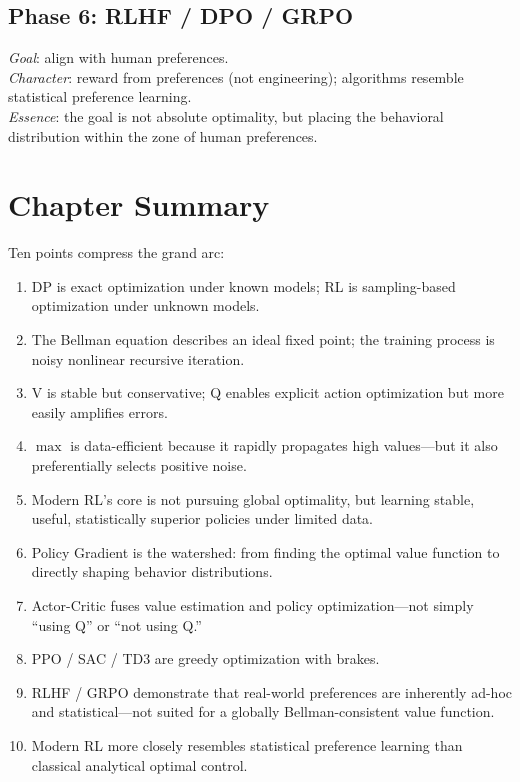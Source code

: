 \subsection*{Phase 6: RLHF / DPO / GRPO}
\emph{Goal}: align with human preferences.\\
\emph{Character}: reward from preferences (not engineering); algorithms resemble statistical preference learning.\\
\emph{Essence}: the goal is not absolute optimality, but placing the behavioral distribution within the zone of human preferences.

\section{Chapter Summary}
\label{sec:ch2-summary}

Ten points compress the grand arc:

\begin{enumerate}
    \item DP is exact optimization under known models; RL is sampling-based optimization under unknown models.
    \item The Bellman equation describes an ideal fixed point; the training process is noisy nonlinear recursive iteration.
    \item V is stable but conservative; Q enables explicit action optimization but more easily amplifies errors.
    \item $\max$ is data-efficient because it rapidly propagates high values---but it also preferentially selects positive noise.
    \item Modern RL's core is not pursuing global optimality, but learning stable, useful, statistically superior policies under limited data.
    \item Policy Gradient is the watershed: from finding the optimal value function to directly shaping behavior distributions.
    \item Actor-Critic fuses value estimation and policy optimization---not simply ``using Q'' or ``not using Q.''
    \item PPO / SAC / TD3 are greedy optimization with brakes.
    \item RLHF / GRPO demonstrate that real-world preferences are inherently ad-hoc and statistical---not suited for a globally Bellman-consistent value function.
    \item Modern RL more closely resembles statistical preference learning than classical analytical optimal control.
\end{enumerate}

